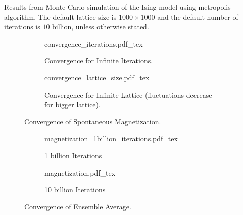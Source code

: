 \documentclass[a4paper, 11pt]{article}
\begin{document}
\vspace*{\fill}
\centering \Large Results from Monte Carlo simulation of the Ising model using metropolis algorithm.
The default lattice size is $1000 \times 1000$ and the default number of iterations is
$10$ billion, unless otherwise stated.
\vspace*{\fill}
\clearpage

\begin{figure}[t]
	\begin{subfigure}{\textwidth}
		\centering
		\def\svgwidth{\columnwidth}
		{convergence_iterations.pdf_tex}
		\caption{Convergence for Infinite Iterations.}
		\vspace{1.5em}
	\end{subfigure}
	\vfill
	\begin{subfigure}{\textwidth}
		\centering
		\def\svgwidth{\columnwidth}
		{convergence_lattice_size.pdf_tex}
		\caption{\centering Convergence for Infinite Lattice (fluctuations decrease for bigger
		         lattice).}
		\vspace{1em}
	\end{subfigure}
	\caption{Convergence of Spontaneous Magnetization.}
\end{figure}

\begin{figure}[t]
	\begin{subfigure}{\textwidth}
		\centering
		\def\svgwidth{\columnwidth}
		{magnetization_1billion_iterations.pdf_tex}
		\caption{1 billion Iterations}
		\vspace{1.5em}
	\end{subfigure}
	\vfill
	\begin{subfigure}{\textwidth}
		\centering
		\def\svgwidth{\columnwidth}
		{magnetization.pdf_tex}
		\caption{10 billion Iterations}
		\vspace{1em}
	\end{subfigure}
	\caption{Convergence of Ensemble Average.}
\end{figure}
\end{document}
